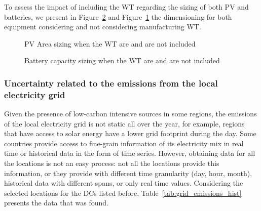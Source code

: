 To assess the impact of including the WT regarding the sizing of both PV and batteries, we present in Figure~\ref{fig:wind_bat} and Figure~\ref{fig:wind_pv}  the dimensioning for both equipment considering and not considering manufacturing WT. 

\begin{figure}[H]
  \centering
  {}
  \caption{PV Area sizing when the WT are and are not included }
  \label{fig:wind_pv}
\end{figure}


\begin{figure}[H]
  \centering
  {}
  \caption{Battery capacity sizing when the WT are and are not included }
  \label{fig:wind_bat}
\end{figure}







\subsubsection{Uncertainty related to the emissions from the local electricity grid }

Given the presence of low-carbon intensive sources in some regions, the emissions of the local electricity grid is not static all over the year, for example, regions that have access to solar energy have a lower grid footprint during the day. Some countries provide access to fine-grain information of its electricity mix in real time or historical data in the form of time series. However, obtaining data for all the locations is not an easy process: not all the locations provide this information, or they provide with different time granularity (day, hour, month), historical data with different spans, or only real time values. Considering the selected locations for the DCs listed before, Table~\ref{tab:grid_emissions_hist} presents the data that was found. 


